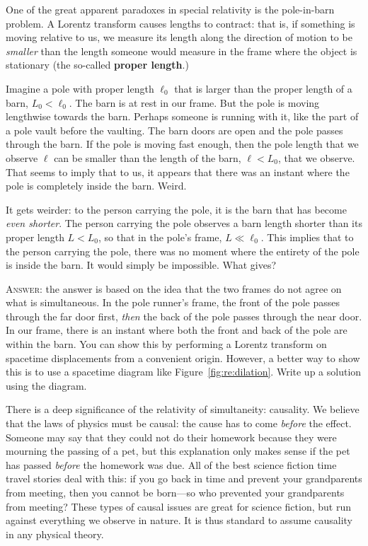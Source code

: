\begin{exercise}
One of the great apparent paradoxes in special relativity is the pole-in-barn problem. A Lorentz transform causes lengths to contract: that is, if something is moving relative to us, we measure its length along the direction of motion to be \emph{smaller} than the length someone would measure in the frame where the object is stationary (the so-called \textbf{proper length}.)

Imagine a pole with proper length $\ell_0$ that is larger than the proper length of a barn, $L_0 < \ell_0$. The barn is at rest in our frame. But the pole is moving lengthwise towards the barn. Perhaps someone is running with it, like the part of a pole vault before the vaulting. The barn doors are open and the pole passes through the barn. If the pole is moving fast enough, then the pole length that we observe $\ell$ can be smaller than the length of the barn, $\ell < L_0$, that we observe. That seems to imply that to us, it appears that there was an instant where the pole is completely inside the barn. Weird.

It gets weirder: to the person carrying the pole, it is the barn that has become \emph{even shorter}. The person carrying the pole observes a barn length shorter than its proper length $L < L_0$, so that in the pole's frame, $L \ll \ell_0$.  This implies that to the person carrying the pole, there was no moment where the entirety of the pole is inside the barn. It would simply be impossible. What gives?

\textsc{Answer:} the answer is based on the idea that the two frames do not agree on what is simultaneous. In the pole runner's frame, the front of the pole passes through the far door first, \emph{then} the back of the pole passes through the near door. In our frame, there is an instant where both the front and back of the pole are within the barn. You can show this by performing a Lorentz transform on spacetime displacements from a convenient origin. However, a better way to show this is to use a spacetime diagram like Figure~\ref{fig:re:dilation}. Write up a solution using the diagram.
\end{exercise}

There is a deep significance of the relativity of simultaneity: causality. We believe that the laws of physics must be causal: the cause has to come \emph{before} the effect. Someone may say that they could not do their homework because they were mourning the passing of a pet, but this explanation only makes sense if the pet has passed \emph{before} the homework was due. All of the best science fiction time travel stories deal with this: if you go back in time and prevent your grandparents from meeting, then you cannot be born---so who prevented your grandparents from meeting? These types of causal issues are great for science fiction, but run against everything we observe in nature. It is thus standard to assume causality in any physical theory.


